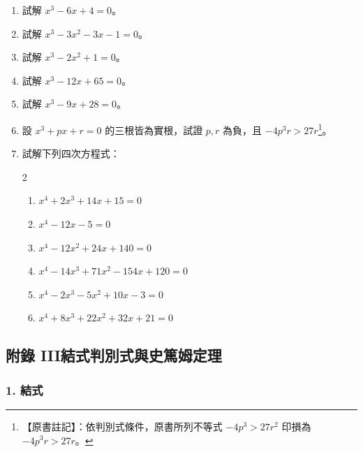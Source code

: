 \begin{enumerate}[label=\arabic*., leftmargin=2em]
  \item 試解 $x^3-6x+4=0$。
  \item 試解 $x^3-3x^2-3x-1=0$。
  \item 試解 $x^3-2x^2+1=0$。
  \item 試解 $x^3-12x+65=0$。
  \item 試解 $x^3-9x+28=0$。
  \item 設 $x^3+px+r=0$ 的三根皆為實根，試證 $p, r$ 為負，且 $-4p^3r > 27r$\label{note:b6s-ch2-p117-cubic-ineq}\footnote{【原書註記】：依判別式條件，原書所列不等式 $-4p^3 > 27r^2$ 印損為 $-4p^3r > 27r$。}。
  \item 試解下列四次方程式：
  \begin{multicols}{2}
  \begin{enumerate}[label=(\roman*)]
    \item $x^4+2x^3+14x+15=0$
    \item $x^4-12x-5=0$
    \item $x^4-12x^2+24x+140=0$
    \item $x^4-14x^3+71x^2-154x+120=0$
    \item $x^4-2x^3-5x^2+10x-3=0$
    \item $x^4+8x^3+22x^2+32x+21=0$
  \end{enumerate}
  \end{multicols}
\end{enumerate}

\subsection*{附錄 III\quad 結式判別式與史篤姆定理}\label{sec:b6s-app3}
\resetsectcounters

\subsubsection*{1. 結式}\label{subsec:b6s-app3-1}

